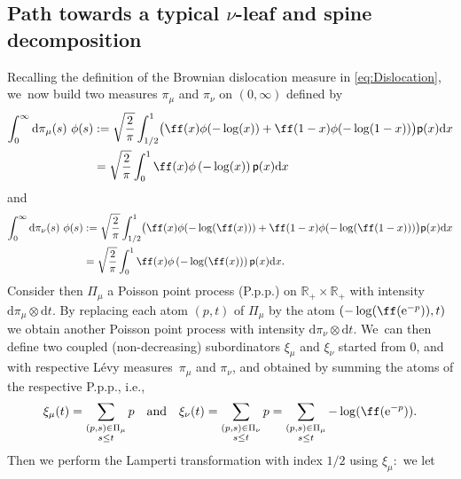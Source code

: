 \documentclass[11pt]{article}
\newcommand{\pp}{\mathsf{p}}
\newcommand{\dd}{\mathrm{d}}
\theoremstyle{definition}
\begin{document}
\subsection{Path towards a typical $\nu$-leaf and spine decomposition}
Recalling the definition of the Brownian dislocation measure in \eqref{eq:Dislocation}, we~now build two measures $\pi_\mu$ and $\pi_\nu$ on $(0,\infty)$ defined by
\begin{align*}
\int_{0}^{\infty} \mathrm{d} \pi_\mu(s) \ \phi(s) &:= \sqrt{\frac{2}{\pi}} \int_{1/2}^{1} \bigl(\ff(x) \phi(-\log (x)) + \ff(1-x) \phi(-\log (1-x))\bigr)\pp(x)\dd x \\
&= \sqrt{\frac{2}{\pi}} \int_0^{1} \ff(x) \phi\left(-\log (x)\right) \pp(x)\dd x
\end{align*}
and
\begin{align*} \int_{0}^{\infty} \mathrm{d} \pi_\nu(s) \ \phi(s) &:= \sqrt{\frac{2}{\pi}} \int_{1/2}^{1}\bigl(\ff(x) \phi(-\log (\ff(x))) + \ff(1-x) \phi(-\log (\ff(1-x)))\bigr)\pp(x)\dd x \\
&= \sqrt{\frac{2}{\pi}} \int_0^{1} \ff(x) \phi\left(-\log (\ff(x))\right)\pp(x)\dd x.
\end{align*}
Consider then $\Pi_\mu$ a Poisson point process (P.p.p.) on $ \mathbb{R}_+ \!\times\! \mathbb{R}_+$ with intensity \hbox{$ \mathrm{d} \pi_\mu \!\otimes\! \mathrm{d}t$}. By replacing each atom $(p,t)$ of $\Pi_\mu$ by the atom $(-\log(\ff (\mathrm{e}^{-p})),t)$ we obtain another Poisson point process with intensity $ \mathrm{d}\pi_\nu \otimes \mathrm{d}t$. We~can then define two coupled (non-decreasing) subordinators $\xi_\mu$ and $\xi_\nu$ started from $0$, and with respective Lévy measures~$\pi_\mu$ and $\pi_\nu$, and obtained by summing the atoms of the respective P.p.p., i.e.,
\begin{equation}\label{defxi}
\xi_\mu(t) = \sum_{\begin{subarray}{c}(p,s) \in \Pi_\mu \\ s \leq t\end{subarray}} p \quad \text{and} \quad \xi_\nu(t) = \sum_{\begin{subarray}{c}(p,s) \in \Pi_\nu \\ s \leq t
\end{subarray}} p = \sum_{\begin{subarray}{c}(p,s) \in \Pi_\mu \\ s \leq t\end{subarray}} -\log(\ff (\mathrm{e}^{-p})).\end{equation}
Then we perform the Lamperti transformation with index $1/2$ using $\xi_\mu:$ we let
\end{document}

